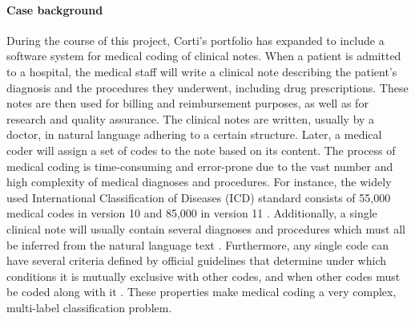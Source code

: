 \paragraph{Case background} During the course of this project, Corti's portfolio has expanded to include a software system for medical coding of clinical notes. 
When a patient is admitted to a hospital, the medical staff will write a clinical note describing the patient's diagnosis and the procedures they underwent, including drug prescriptions. 
These notes are then used for billing and reimbursement purposes, as well as for research and quality assurance. 
The clinical notes are written, usually by a doctor, in natural language adhering to a certain structure. Later, a medical coder will assign a set of codes to the note based on its content. 
The process of medical coding is time-consuming and error-prone due to the vast number and high complexity of medical diagnoses and procedures. For instance, the widely used International Classification of Diseases (ICD) standard consists of 55,000 medical codes in version 10 and 85,000 in version 11 \parencite{worldhealthorganisationwho_international_2023}. Additionally, a single clinical note will usually contain several diagnoses and procedures which must all be inferred from the natural language text \parencite{johnsonMIMICIIIFreelyAccessible2016,johnsonMIMICIVFreelyAccessible2023}. 
Furthermore, any single code can have several criteria defined by official guidelines that determine under which conditions it is mutually exclusive with other codes, and when other codes must be coded along with it \parencite{centersformedicaremedicaidservicesus_icd10cm_2023}. These properties make medical coding a very complex, multi-label classification problem. 


